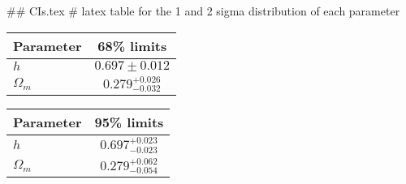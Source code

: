 ## CIs.tex
# latex table for the 1 and 2 sigma distribution of each parameter

\begin{tabular} { l  c}
 Parameter &  68\% limits\\
\hline
{\boldmath$h              $} & $0.697\pm 0.012            $\\
{\boldmath$\Omega_m       $} & $0.279^{+0.026}_{-0.032}   $\\
\hline
\end{tabular}

\begin{tabular} { l  c}
 Parameter &  95\% limits\\
\hline
{\boldmath$h              $} & $0.697^{+0.023}_{-0.023}   $\\
{\boldmath$\Omega_m       $} & $0.279^{+0.062}_{-0.054}   $\\
\hline
\end{tabular}

